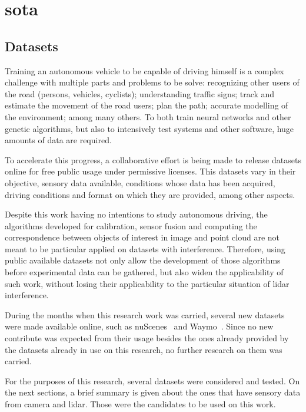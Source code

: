 \chapter{\acl{sota}}
\label{chapter:sota}

\section{Datasets}
\label{section:sota:datasets}

Training an autonomous vehicle to be capable of driving himself is a complex challenge with multiple parts and problems to be solve: recognizing other users of the road (persons, vehicles, cyclists); understanding traffic signs; track and estimate the movement of the road users; plan the path; accurate modelling of the environment; among many others. To both train neural networks and other genetic algorithms, but also to intensively test systems and other software, huge amounts of data are required.

To accelerate this progress, a collaborative effort is being made to release datasets online for free public usage under permissive licenses. This datasets vary in their objective, sensory data available, conditions whose data has been acquired, driving conditions and format on which they are provided, among other aspects. 

Despite this work having no intentions to study autonomous driving, the algorithms developed for calibration, sensor fusion and computing the correspondence between objects of interest in image and point cloud are not meant to be particular applied on datasets with interference. Therefore, using public available datasets not only allow the development of those algorithms before experimental data can be gathered, but also widen the applicability of such work, without losing their applicability to the particular situation of \ac{lidar} interference.

During the months when this research work was carried, several new datasets were made available online, such as nuScenes~\cite{nuScenes2019} and Waymo~\cite{Waymo}. Since no new contribute was expected from their usage besides the ones already provided by the datasets already in use on this research, no further research on them was carried. 

For the purposes of this research, several datasets were considered and tested. On the next sections, a brief summary is given about the ones that have sensory data from camera and \ac{lidar}. Those were the candidates to be used on this work.

